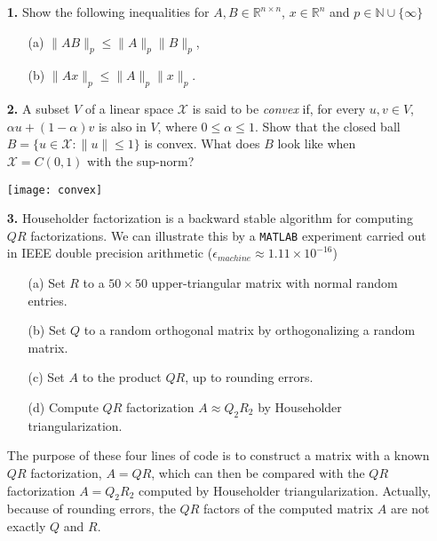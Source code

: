 \documentclass[10pt]{report}
\begin{document}
\begin{enumerate}
  \item[\textbf{1.}]Show the following inequalities for $A,
  B\in\mathbb{R}^{n\times n}$, $x\in\mathbb{R}^n$ and 
  $p\in\mathbb{N}\cup\{\infty\}$
\begin{enumerate}
  \item[(a)]$\|AB\|_p\leq\|A\|_p\|B\|_p$,
  \item[(b)]$\|Ax\|_p\leq\|A\|_p\|x\|_p$.
\end{enumerate}

\vspace{0.7cm}

 \item[\textbf{2.}] A subset $V$ of a linear space $\mathcal{X}$ is
 said to be \textit{convex} if, for every $u,v\in V$, $\alpha u+(1-
 \alpha)v$ is also in $V$, where $0\leq\alpha\leq1$. Show that the
 closed ball $B=\{u\in\mathcal{X}:\|u\|\leq1\}$ is convex. What does $B$ look
 like when $\mathcal{X}=C(0,1)$ with the sup-norm?\\
\begin{center}
\texttt{[image: convex]}
\end{center}

\vspace{0.7cm}

\item[\textbf{3.}] Householder factorization is a backward stable algorithm
  for computing $QR$ factorizations. We can illustrate this by a \verb+MATLAB+
  experiment carried out in IEEE double precision arithmetic
  ($\epsilon_{machine}\approx 1.11\times10^{-16}$)

  \begin{enumerate}
    \item[(a)] Set $R$ to a $50\times50$ upper-triangular matrix with normal
    random entries.
    \item[(b)] Set $Q$ to a random orthogonal matrix by orthogonalizing a random
    matrix.
    \item[(c)] Set $A$ to the product $QR$, up to rounding errors.
    \item[(d)] Compute $QR$ factorization $A\approx Q_2R_2$ by Householder
    triangularization. 
  \end{enumerate}

  The purpose of these four lines of code is to construct a matrix with a known
  $QR$ factorization, $A=QR$, which can then be compared with the $QR$
  factorization $A=Q_2R_2$ computed by Householder triangularization. Actually,
  because of rounding errors, the $QR$ factors of the computed matrix $A$ are
  not exactly $Q$ and $R$.


\end{enumerate}
\end{document}
